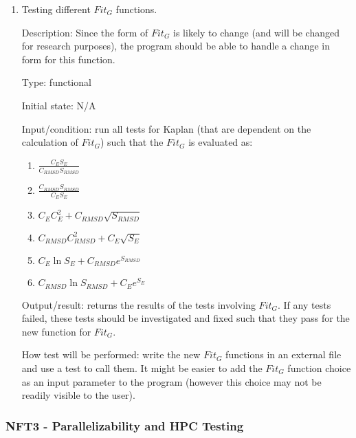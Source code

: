 \documentclass[12pt, titlepage]{article}
\newcommand{\progname}{Kaplan} %
\begin{document}
\begin{enumerate}
	\item Testing different $Fit_G$ functions.
	
	Description: Since the form of $Fit_G$ is likely to change (and will be 
	changed for research purposes), the program should be able to handle a 
	change in form for this function.
	
	Type: functional
	
	Initial state: N/A
	
	Input/condition: run all tests for \progname{} (that are dependent on the 
	calculation of $Fit_G$) such that the $Fit_G$ is evaluated as:
	
	\begin{enumerate}
		\item $\frac{C_E S_E}{C_{RMSD} S_{RMSD}}$
		\item $\frac{C_{RMSD} S_{RMSD}}{C_E S_E}$
		\item $C_E C_E^2 + C_{RMSD}\sqrt{S_{RMSD}}$
		\item $C_{RMSD} C_{RMSD}^2 + C_E\sqrt{S_E}$
		\item $C_E\ln{S_E} + C_{RMSD} e^{S_{RMSD}}$
		\item $C_{RMSD}\ln{S_{RMSD}} + C_E e^{S_E}$
	\end{enumerate}

	Output/result: returns the results of the tests involving
        $Fit_G$.  If any 
	tests failed, these tests should be investigated and fixed such that they 
	pass for the new function for $Fit_G$.
	
	How test will be performed: write the new $Fit_G$ functions in an external 
	file and use a test to call them. It might be easier to add the $Fit_G$ 
	function choice as an input parameter to the program (however this choice 
	may not be readily visible to the user).
	
\end{enumerate}

\subsubsection{NFT3 - Parallelizability and HPC Testing}
\end{document}
